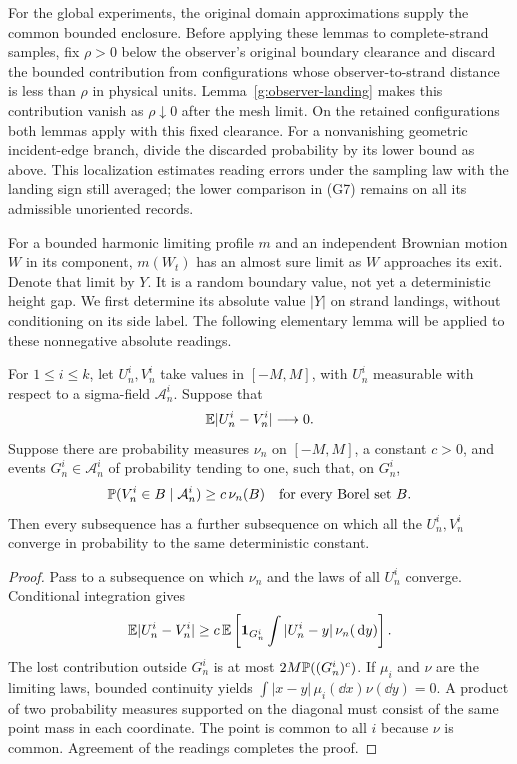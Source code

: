 For the global experiments, the original domain approximations supply
the common bounded enclosure. Before applying these lemmas to
complete-strand samples, fix $\rho>0$ below the observer's original
boundary clearance and discard the bounded contribution from
configurations whose observer-to-strand distance is less than $\rho$
in physical units. Lemma~\ref{g:observer-landing} makes this contribution
vanish as $\rho\downarrow0$ after the mesh limit. On the retained
configurations both lemmas apply with this fixed clearance. For a
nonvanishing geometric incident-edge branch, divide the discarded
probability by its lower bound as above. This localization estimates
reading errors under the sampling law with the landing sign still
averaged; the lower comparison in (G7) remains on all its admissible
unoriented records.

For a bounded harmonic limiting profile $m$ and an independent Brownian
motion $W$ in its component, $m(W_t)$ has an almost sure limit as $W$
approaches its exit. Denote that limit by $Y$. It is a random boundary
value, not yet a deterministic height gap. We first determine its
absolute value $|Y|$ on strand landings, without conditioning on its
side label. The following elementary lemma will be applied to these
nonnegative absolute readings.

\begin{lemma}
\label{h:common-kernel}
For $1\le i\le k$, let $U^i_n,V^i_n$ take values in $[-M,M]$, with
$U^i_n$ measurable with respect to a sigma-field $\mathcal A^i_n$.
Suppose that
\[
 \mathbb E|U^i_n-V^i_n|\longrightarrow0.
\]
Suppose there are probability measures $\nu_n$ on $[-M,M]$, a constant
$c>0$, and events $G^i_n\in\mathcal A^i_n$ of probability tending to one,
such that, on $G^i_n$,
\[
 \mathbb P(V^i_n\in B\mid\mathcal A^i_n)\ge c\,\nu_n(B)
 \quad\text{for every Borel set }B.
\]
Then every subsequence has a further subsequence on which all the
$U^i_n,V^i_n$ converge in probability to the same deterministic constant.
\end{lemma}
\begin{proof}
Pass to a subsequence on which $\nu_n$ and the laws of all $U^i_n$ converge.
Conditional integration gives
\[
 \mathbb E|U^i_n-V^i_n|
 \ge c\,\mathbb E\left[\mathbf1_{G^i_n}
          \int|U^i_n-y|\,\nu_n(\,\mathrm d y)\right].
\]
The lost contribution outside $G^i_n$ is at most $2M\mathbb P((G^i_n)^c)$.
If $\mu_i$ and $\nu$ are the limiting laws, bounded continuity yields
$\int|x-y|\,\mu_i(\dd x)\nu(\dd y)=0$.
A product of two probability measures supported on the diagonal must
consist of the same point mass in each coordinate. The point is common
to all $i$ because $\nu$ is common. Agreement of the readings completes
the proof.
\end{proof}

